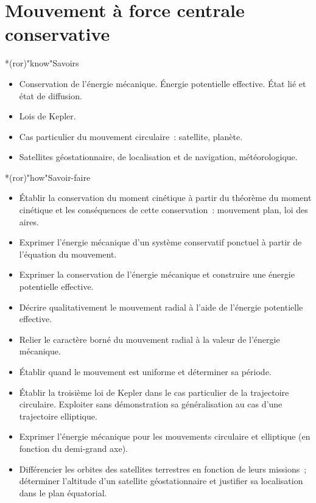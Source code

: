 \documentclass[../../main/main.tex]{subfiles}
\begin{document}
\setcounter{chapter}{6}


\chapter{Mouvement \`a force centrale conservative}

\vspace*{\fill}

\begin{prgm}
	\footnotesize
	\begin{tcb}*(ror)"know"{Savoirs}
		\begin{itemize}
			\item Conservation de l'énergie mécanique. Énergie potentielle effective.
			      État lié et état de diffusion.
			\item Lois de Kepler.
			\item Cas particulier du mouvement circulaire~: satellite, planète.
			\item Satellites géostationnaire, de localisation et de navigation,
			      météorologique.
		\end{itemize}
	\end{tcb}
	\begin{tcb}*(ror)"how"{Savoir-faire}
		\begin{itemize}
			\item Établir la conservation du moment cinétique à partir du théorème du
			      moment cinétique et les conséquences de cette conservation~:
			      mouvement plan, loi des aires.
			\item Exprimer l'énergie mécanique d'un système conservatif ponctuel à
			      partir de l'équation du mouvement.
			\item Exprimer la conservation de l'énergie mécanique et construire une
			      énergie potentielle effective.
			\item Décrire qualitativement le mouvement radial à l'aide de l'énergie
			      potentielle effective.
			\item Relier le caractère borné du mouvement radial à la valeur de
			      l'énergie mécanique.
			\item Établir quand le mouvement est uniforme et déterminer sa période.
			\item Établir la troisième loi de Kepler dans le cas particulier de la
			      trajectoire circulaire. Exploiter sans démonstration sa
			      généralisation au cas d'une trajectoire elliptique.
			\item Exprimer l'énergie mécanique pour les mouvements circulaire et
			      elliptique (en fonction du demi-grand axe).
			\item Différencier les orbites des satellites terrestres en fonction de
			      leurs missions~; déterminer l'altitude d'un satellite
			      géostationnaire et justifier sa localisation dans le plan
			      équatorial.
		\end{itemize}
	\end{tcb}
\end{prgm}
\end{document}
